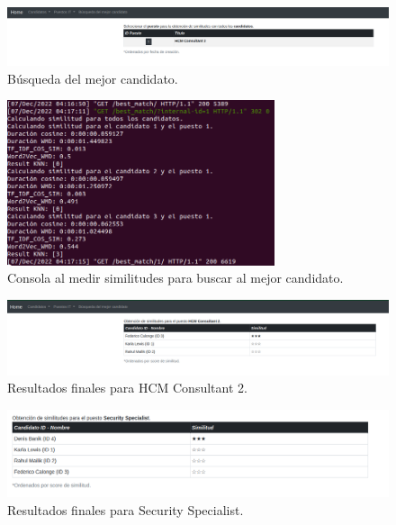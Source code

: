 \documentclass[12pt,a4paper]{article}
\begin{document}
\begin{sloppypar}
\begin{figure}[H]    %
 \centering
 \includegraphics[width=1\textwidth]{images/implementacion_web/caso_uso_paso_2.png}
 \caption{Búsqueda del mejor candidato.} 
 \label{fig:caso_uso_paso_2}
\end{figure}

\begin{figure}[H]    %
 \centering
 \includegraphics[width=0.7\textwidth]{images/implementacion_web/caso_uso_paso_2_1.png}
 \caption{Consola al medir similitudes para buscar al mejor candidato.} 
 \label{fig:caso_uso_paso_2_1}
\end{figure}

\begin{figure}[H]    %
 \centering
 \includegraphics[width=1\textwidth]{images/implementacion_web/caso_uso_paso_2_2.png}
 \caption{Resultados finales para HCM Consultant 2.} 
 \label{fig:caso_uso_paso_2_2}
\end{figure}

\begin{figure}[H]    %
 \centering
 \includegraphics[width=1\textwidth]{images/implementacion_web/caso_uso_paso_4.png}
 \caption{Resultados finales para Security Specialist.} 
 \label{fig:caso_uso_paso_4}
\end{figure}


\end{sloppypar}
\end{document}

